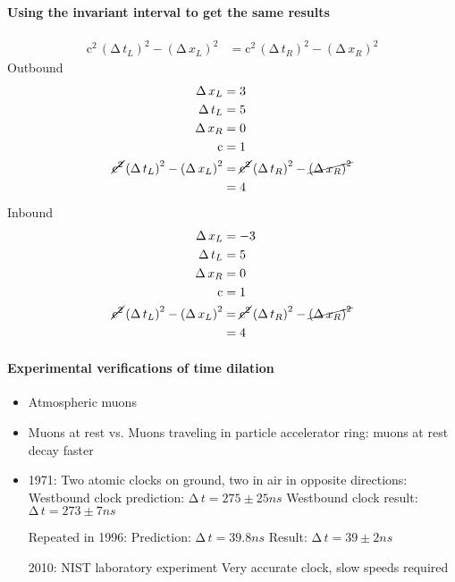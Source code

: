 \documentclass[pagesize,headsepline,10pt,parskip=half]{scrreprt}
\newcommand*\mdelta[1]{\ensuremath{\mathrm{\Delta\,}#1}}
\newcommand{\const}[1]{\ensuremath{\mathrm{#1}}}
\renewcommand{\c}{\const{c}}
\begin{document}
          \paragraph{Using the invariant interval to get the same results}
            \begin{align*}
              \c^2 \, {(\mdelta{t_L})}^2 - {(\mdelta{x_L})}^2
                &= \c^2 \, {(\mdelta{t_R})}^2 - {(\mdelta{x_R})}^2
            \end{align*}
            Outbound
            \begin{align*}
              \mdelta{x_L} &= 3\\
              \mdelta{t_L} &= 5\\
              \mdelta{x_R} &= 0\\
              \c &= 1\\
              \cancel{\c^2} \, {(\mdelta{t_L})}^2 - {(\mdelta{x_L})}^2
                &= \cancel{\c^2} \, {(\mdelta{t_R})}^2 - \cancel{{(\mdelta{x_R})}^2}\\
                &= 4
            \end{align*}
            Inbound
            \begin{align*}
              \mdelta{x_L} &= -3\\
              \mdelta{t_L} &= 5\\
              \mdelta{x_R} &= 0\\
              \c &= 1\\
              \cancel{\c^2} \, {(\mdelta{t_L})}^2 - {(\mdelta{x_L})}^2
                &= \cancel{\c^2} \, {(\mdelta{t_R})}^2 - \cancel{{(\mdelta{x_R})}^2}\\
                &= 4
            \end{align*}

        \paragraph{Experimental verifications of time dilation}
          \begin{itemize}
            \item Atmospheric muons
            \item Muons at rest vs. Muons traveling in particle accelerator ring:
              muons at rest decay faster
            \item 1971: Two atomic clocks on ground, two in air in opposite directions:
              Westbound clock prediction: $\mdelta{t} = 275 \pm 25 ns$
              Westbound clock result: $\mdelta{t} = 273 \pm 7 ns$

              Repeated in 1996:
              Prediction: $\mdelta{t} = 39.8 ns$
              Result: $\mdelta{t} = 39 \pm 2 ns$

              2010: NIST laboratory experiment
              Very accurate clock, slow speeds required
          \end{itemize}
\end{document}
